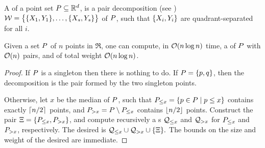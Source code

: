 \documentclass[12pt]{article}%
\begin{document}
A  of a point set
$P \subseteq \mathbb{R}^d$, is a pair decomposition (see
)
$\mathcal{W} = \bigl\{ \{ X_1, Y_1 \}, \ldots, \{ X_s, Y_s \}
\bigr\}$ of $P$, such that $\{ X_i, Y_i\}$ are
quadrant-separated for all $i$.


\begin{lemma}
    Given a set $P$ of $n$ points in $\Re$, one can compute, in
    $\mathcal{O}( n \log n)$ time, a \QSPD of $P$ with $\mathcal{O}(n)$ pairs, and
    of total weight $\mathcal{O}( n \log n)$.
\end{lemma}
\begin{proof}
    If $P$ is a singleton then there is nothing to do. If
    $P = \{ p, q \}$, then the decomposition is the pair formed
    by the two singleton points.

    Otherwise, let $x$ be the median of $P$, such that
    $P_{\leq x} = \left\{  p \in P  \;\middle\vert\; p \leq x \right\}$ contains exactly
    $\left\lceil {n/2} \right\rceil$ points, and $P_{> x} = P \setminus P_{\leq x}$
    contains $\left\lfloor {n/2} \right\rfloor$ points. Construct the pair
    $\Xi = \{ P_{\leq x}, P_{> x} \}$, and compute recursively a
    \QSPD{}s $\mathcal{Q}_{\leq x}$ and $\mathcal{Q}_{> x}$ for $P_{\leq x}$ and
    $P_{> x}$, respectively. The desired \QSPD is
    \begin{math}
        \mathcal{Q}_{\leq x} \cup \mathcal{Q}_{> x} \cup \{ \Xi \}.
    \end{math}
    The bounds on the size and weight of the desired \QSPD are
    immediate.
\end{proof}
\end{document}
